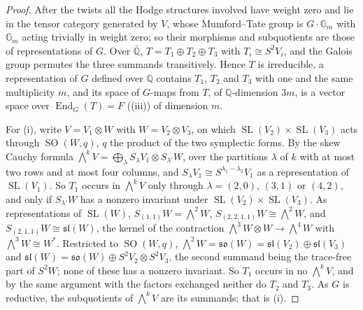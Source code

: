 \documentclass[11pt,reqno]{amsart}
\theoremstyle{plain}
\theoremstyle{definition}
\theoremstyle{remark}
\newcommand{\QQ}{\mathbb{Q}}
\DeclareMathOperator{\End}{End}
\DeclareMathOperator{\SL}{SL}
\DeclareMathOperator{\SO}{SO}
\begin{document}
\begin{proof}
After the twists all the Hodge structures involved have weight zero and lie in
the tensor category generated by $V$, whose Mumford--Tate group is
$G\cdot\mathbb{G}_{m}$ with $\mathbb{G}_{m}$ acting trivially in weight zero;
so their morphisms and subquotients are those of representations of $G$.
Over $\bar{\QQ}$, $T=T_{1}\oplus T_{2}\oplus T_{3}$ with $T_{i}\cong S^{2}V_{i}$,
and the Galois group permutes the three summands transitively. Hence $T$ is
irreducible, a representation of $G$ defined over $\QQ$ contains
$T_{1}$, $T_{2}$ and $T_{3}$ with one and the same multiplicity $m$, and its
space of $G$-maps from $T$, of $\QQ$-dimension $3m$, is a vector space over
$\End_{G}(T)=F$ ((iii)) of dimension $m$.

For (i), write $V=V_{1}\otimes W$ with $W=V_{2}\otimes V_{3}$, on which
$\SL(V_{2})\times\SL(V_{3})$ acts through $\SO(W,q)$, $q$ the product of the
two symplectic forms. By the skew Cauchy formula
$\bigwedge^{k}V=\bigoplus_{\lambda}S_{\lambda}V_{1}\otimes S_{\lambda'}W$,
over the partitions $\lambda$ of $k$ with at most two rows and at most four
columns, and $S_{\lambda}V_{1}\cong S^{\lambda_{1}-\lambda_{2}}V_{1}$ as a
representation of $\SL(V_{1})$. So $T_{1}$ occurs in $\bigwedge^{k}V$ only
through $\lambda=(2,0)$, $(3,1)$ or $(4,2)$, and only if $S_{\lambda'}W$ has a
nonzero invariant under $\SL(V_{2})\times\SL(V_{3})$. As representations of
$\SL(W)$, $S_{(1,1)}W=\bigwedge^{2}W$, $S_{(2,2,1,1)}W\cong\bigwedge^{2}W$, and
$S_{(2,1,1)}W\cong\mathfrak{sl}(W)$, the kernel of the contraction
$\bigwedge^{3}W\otimes W\to\bigwedge^{4}W$ with $\bigwedge^{3}W\cong W^{*}$.
Restricted to $\SO(W,q)$, $\bigwedge^{2}W=\mathfrak{so}(W)=
\mathfrak{sl}(V_{2})\oplus\mathfrak{sl}(V_{3})$ and
$\mathfrak{sl}(W)=\mathfrak{so}(W)\oplus S^{2}V_{2}\otimes S^{2}V_{3}$, the
second summand being the trace-free part of $S^{2}W$; none of these has a
nonzero invariant. So $T_{1}$ occurs in no $\bigwedge^{k}V$, and by the same
argument with the factors exchanged neither do $T_{2}$ and $T_{3}$. As $G$ is
reductive, the subquotients of $\bigwedge^{k}V$ are its summands; that is (i).


\end{proof}
\end{document}
